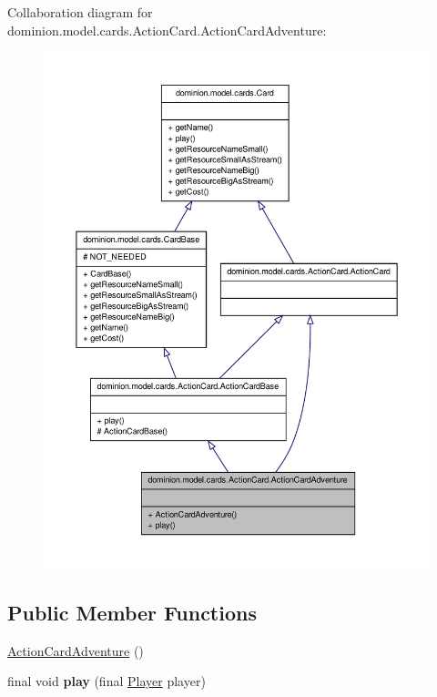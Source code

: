 \-Collaboration diagram for dominion.\-model.\-cards.\-Action\-Card.\-Action\-Card\-Adventure\-:
\nopagebreak
\begin{figure}[H]
\begin{center}
\leavevmode
\includegraphics[width=350pt]{classdominion_1_1model_1_1cards_1_1ActionCard_1_1ActionCardAdventure__coll__graph}
\end{center}
\end{figure}
\subsection*{\-Public \-Member \-Functions}
\begin{DoxyCompactItemize}
\item 
\hyperlink{classdominion_1_1model_1_1cards_1_1ActionCard_1_1ActionCardAdventure_a7eef424c28b22d883c21f49317a042b7}{\-Action\-Card\-Adventure} ()
\item 
\hypertarget{classdominion_1_1model_1_1cards_1_1ActionCard_1_1ActionCardAdventure_af1548c7dba90defe580658f1910b0248}{final void {\bfseries play} (final \hyperlink{interfacedominion_1_1model_1_1Player}{\-Player} player)}\label{classdominion_1_1model_1_1cards_1_1ActionCard_1_1ActionCardAdventure_af1548c7dba90defe580658f1910b0248}

\end{DoxyCompactItemize}


